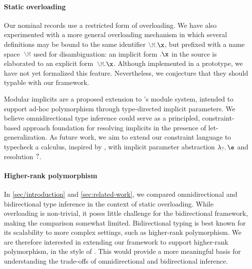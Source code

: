 \documentclass[acmsmall,screen,nonacm,review]{acmart}
\begin{document}
\paragraph{Static overloading}

Our nominal records use a restricted form of overloading.  We have also
experimented with a more general overloading mechanism
  in
which several definitions may be bound to the same identifier
${\color{gray}\M.}\x$, but prefixed with a name space~$\color{gray}\M$ used
for disambiguation: an implicit form $\eover \x$ in the source is elaborated
to an explicit form~$\exover {{\color{gray}\M}} \x$.
%
Although implemented in a prototype, we have not yet
formalized this feature.  Nevertheless, we conjecture
that they should typable with our framework.

Modular implicits \citep*{White-Bour-Yallop/Modular_Implicits/ml2014} are a
proposed extension to \OCaml's module system, intended to support ad-hoc
polymorphism through type-directed implicit parameters. We believe
omnidirectional type inference could serve as a principled, constraint-based
approach foundation for resolving implicits in the presence of
let-generalization.
%
As future work, we aim to extend our constraint language to typecheck a
calculus, inspired by \COCHIS
\citep*{journals/jfp/SchrijversOWM19}, with implicit parameter abstraction
$\eifun \t \e$ and resolution $?\relax$.


\paragraph{Higher-rank polymorphism}

In \cref{sec/introduction} and \cref{sec:related-work}, we compared
omnidirectional and bidirectional type inference in the context of static
overloading. While overloading is non-trivial, it poses little challenge for the
bidirectional framework, making the comparison somewhat limited. Bidirectional
typing is best known for its scalability to more complex settings, such as
higher-rank polymorphism. We are therefore interested in extending our
framework to support higher-rank polymorphism, in the style of
\citet*{dunfield-krishnaswami-bidirectional-poly}. This would provide a more
meaningful basis for understanding the trade-offs of omnidirectional and
bidirectional inference.
\end{document}
